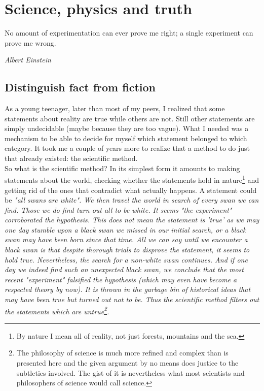 \chapter{Science, physics and truth}
\label{SciencePhysPhilo}

\epigraph{No amount of experimentation can ever prove me right; a single experiment can prove me wrong.}{\textit{Albert Einstein}}

\section{Distinguish fact from fiction}

\noindent As a young teenager, later than most of my peers, I realized that some statements about reality are true while others are not. Still other statements are simply undecidable (maybe because they are too vague). What I needed was a mechanism to be able to decide for myself which statement belonged to which category. It took me a couple of years more to realize that a method to do just that already existed: the scientific method.\\

\noindent So what is the scientific method? In its simplest form it amounts to making statements about the world, checking whether the statements hold in nature\footnote{By nature I mean all of reality, not just forests, mountains and the sea.} and getting rid of the ones that contradict what actually happens. A statement could be \itshape "all swans are white"\normalfont. We then travel the world in search of every swan we can find. Those we do find turn out all to be white. It seems "the experiment" corroborated the hypothesis. This does not mean the statement is 'true' as we may one day stumble upon a black swan we missed in our initial search, or a black swan may have been born since that time. All we can say until we encounter a black swan is that despite thorough trials to disprove the statement, it seems to hold true. Nevertheless, the search for a non-white swan continues. And if one day we indeed find such an unexpected black swan, we conclude that the most recent "experiment" falsified the hypothesis (which may even have become a respected theory by now). It is thrown in the garbage bin of historical ideas that may have been true but turned out not to be. Thus the scientific method filters out the statements which are untrue\footnote{The philosophy of science is much more refined and complex than is presented here and the given argument by no means does justice to the subtleties involved. The gist of it is nevertheless what most scientists and philosophers of science would call science.}.\\


